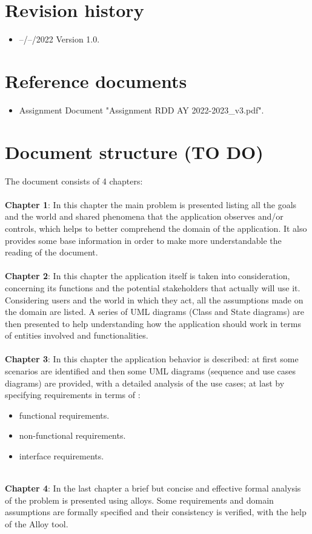 \documentclass[a4paper]{report}
\begin{document}
\section{Revision history}
\begin{itemize}
\item --/--/2022 Version 1.0.
\end{itemize}
\section{Reference documents}
\begin{itemize}
\item Assignment Document "Assignment RDD AY 2022-2023\_v3.pdf".
\end{itemize}
\section{Document structure (TO DO)}

The document consists of 4 chapters:
\\ 
\\
\textbf{Chapter 1}: In this chapter the main problem is presented listing all the goals and the world and shared phenomena that the application observes and/or controls, which helps to better comprehend the domain of the application. It also provides some base information in order to make more understandable the reading of the document.\\ \\
\textbf{Chapter 2}: In this chapter the application itself is taken into consideration, concerning its functions and the potential stakeholders that actually will use it. Considering users and the world in which they act, all the assumptions made on the domain are listed. A series of UML diagrams (Class and State diagrams) are then presented to help understanding how the application should work in terms of entities involved and functionalities.\\ \\
\textbf{Chapter 3}: 
In this chapter the application behavior is described: at first some scenarios are identified and then some UML diagrams (sequence and use cases diagrams) are provided, with a detailed analysis of the use cases; at last by specifying requirements in terms of :
\begin{itemize}
\item functional requirements.
\item non-functional requirements.
\item interface requirements.\\ \\
\end{itemize}
\textbf{Chapter 4}: In the last chapter a brief but concise and effective formal analysis of the problem is presented using alloys. Some requirements and domain assumptions are formally specified and their consistency is verified, with the help of the Alloy tool.
\\
\end{document}
